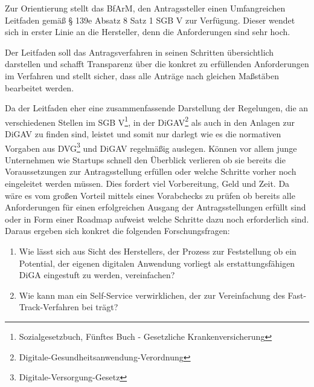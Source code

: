 Zur Orientierung stellt das BfArM, den Antragssteller einen Umfangreichen Leitfaden gemäß § 139e Absatz 8 Satz 1 SGB V zur Verfügung. Dieser wendet sich in erster Linie an die Hersteller, denn die Anforderungen sind sehr hoch.

Der Leitfaden soll das Antragsverfahren in seinen Schritten übersichtlich darstellen und schafft Transparenz über die konkret zu erfüllenden Anforderungen im Verfahren und stellt sicher, dass alle Anträge nach gleichen Maßstäben bearbeitet werden.

Da der Leitfaden eher eine zusammenfassende Darstellung der
Regelungen, die an verschiedenen Stellen im SGB V\footnote{Sozialgesetzbuch, Fünftes Buch - Gesetzliche Krankenversicherung\label{ftn:sgb}}, in der DiGAV\footnote{Digitale-Gesundheitsanwendung-Verordnung\label{ftn:digav}} als auch in den Anlagen zur DiGAV zu finden sind, leistet und somit nur darlegt wie es die normativen Vorgaben aus DVG\footnote{Digitale-Versorgung-Gesetz\label{ftn:dvg}} und DiGAV regelmäßig auslegen.
Können vor allem junge Unternehmen wie Startups schnell den Überblick verlieren ob sie bereits die Voraussetzungen zur Antragsstellung erfüllen oder welche Schritte vorher noch eingeleitet werden müssen. Dies fordert viel Vorbereitung, Geld und Zeit. Da wäre es vom großen Vorteil mittels eines Vorabchecks zu prüfen ob bereits alle Anforderungen für einen erfolgreichen Ausgang der Antragsstellungen erfüllt sind oder in Form einer Roadmap aufweist welche Schritte dazu noch erforderlich sind. Daraus ergeben sich konkret die folgenden Forschungsfragen:

\begin{enumerate}
         \item Wie lässt sich aus Sicht des Herstellers, der Prozess zur Feststellung ob ein Potential, der eigenen digitalen Anwendung vorliegt als erstattungsfähigen DiGA eingestuft zu werden, vereinfachen?
         \item Wie kann man ein Self-Service verwirklichen, der zur Vereinfachung des Fast-Track-Verfahren bei trägt?
\end{enumerate}

